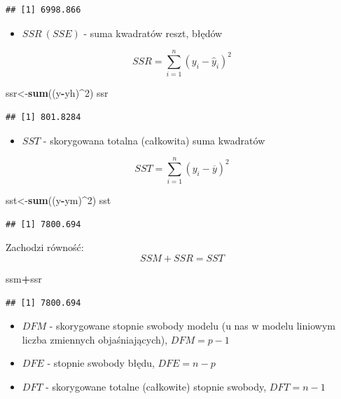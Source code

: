 \documentclass[]{article}
\newenvironment{Shaded}{\begin{snugshade}}{\end{snugshade}}
\newcommand{\KeywordTok}[1]{\textcolor[rgb]{0.13,0.29,0.53}{\textbf{#1}}}
\newcommand{\DecValTok}[1]{\textcolor[rgb]{0.00,0.00,0.81}{#1}}
\newcommand{\OperatorTok}[1]{\textcolor[rgb]{0.81,0.36,0.00}{\textbf{#1}}}
\newcommand{\NormalTok}[1]{#1}
\providecommand{\tightlist}{%
  \setlength{\itemsep}{0pt}\setlength{\parskip}{0pt}}
\begin{document}
\begin{verbatim}
## [1] 6998.866
\end{verbatim}

\begin{itemize}
\tightlist
\item
  \(SSR \ (SSE)\) - suma kwadratów reszt, błędów
\end{itemize}

\[SSR=\sum_{i=1}^n ( y_i-\hat{y}_i )^2\]

\begin{Shaded}
\begin{Highlighting}[]
\NormalTok{ssr<-}\KeywordTok{sum}\NormalTok{((y}\OperatorTok{-}\NormalTok{yh)}\OperatorTok{^}\DecValTok{2}\NormalTok{)}
\NormalTok{ssr}
\end{Highlighting}
\end{Shaded}

\begin{verbatim}
## [1] 801.8284
\end{verbatim}

\begin{itemize}
\tightlist
\item
  \(SST\) - skorygowana totalna (całkowita) suma kwadratów
\end{itemize}

\[ SST = \sum_{i=1}^n ( y_i-\overline{y} )^2\]

\begin{Shaded}
\begin{Highlighting}[]
\NormalTok{sst<-}\KeywordTok{sum}\NormalTok{((y}\OperatorTok{-}\NormalTok{ym)}\OperatorTok{^}\DecValTok{2}\NormalTok{)}
\NormalTok{sst}
\end{Highlighting}
\end{Shaded}

\begin{verbatim}
## [1] 7800.694
\end{verbatim}

Zachodzi równość: \[SSM+SSR=SST\]

\begin{Shaded}
\begin{Highlighting}[]
\NormalTok{ssm}\OperatorTok{+}\NormalTok{ssr}
\end{Highlighting}
\end{Shaded}

\begin{verbatim}
## [1] 7800.694
\end{verbatim}

\begin{itemize}
\tightlist
\item
  \(DFM\) - skorygowane stopnie swobody modelu (u nas w modelu liniowym
  liczba zmiennych objaśniających), \(DFM=p-1\)
\item
  \(DFE\) - stopnie swobody błędu, \(DFE=n-p\)
\item
  \(DFT\) - skorygowane totalne (całkowite) stopnie swobody, \(DFT=n-1\)
\end{itemize}
\end{document}
